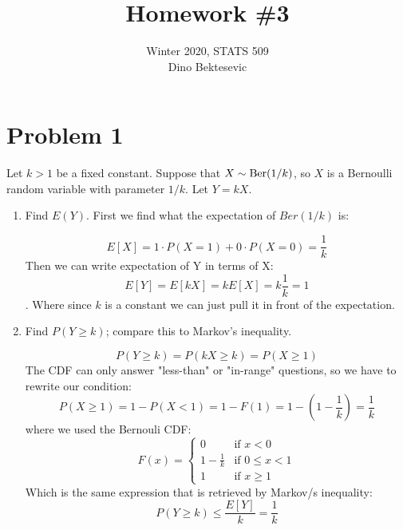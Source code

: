 \documentclass{article}
\date{{}}
\newcommand{\1}{\mathbf{1}}
\begin{document}
\title{Homework \#3}
\author{\normalsize{Winter 2020, STATS 509}\\
\normalsize{Dino Bektesevic}}
\maketitle

\section*{Problem 1}
Let $k > 1$ be a fixed constant. Suppose that $X \sim \hbox{Ber}(1/k)$, so $X$ is a Bernoulli random variable with parameter $1/k$. Let $Y=kX$.
\begin{enumerate}
    \item Find $E(Y)$. First we find what the expectation of $Ber(1/k)$ is:
    
    $$E[X] = 1\cdot P(X=1) + 0\cdot P(X=0) = \frac{1}{k}$$
    Then we can write expectation of Y in terms of X:
    $$E[Y] = E[kX] = k E[X] = k \frac{1}{k} = 1$$.
    Where since $k$ is a constant we can just pull it in front of the expectation. 
    
    \item Find $P(Y \geq k)$; compare this to Markov's inequality.
    
    $$P(Y\geq k) = P(kX \geq k) = P(X\geq 1)$$
    The CDF can only answer "less-than" or "in-range" questions, so we have to rewrite our condition:
    $$P(X\geq 1) = 1 - P(X<1) = 1 - F(1) = 1 - (1 - \frac{1}{k}) = \frac{1}{k}$$
    where we used the Bernouli CDF:
    $$F(x) = \begin{cases} 
	        0 &\mbox{if } x < 0 \\
	        1 - \frac{1}{k} &\mbox{if } 0 \leq x < 1 \\
            1 & \mbox{if } x \geq 1
        \end{cases}  
    $$
    Which is the same expression that is retrieved by Markov/s inequality:
    $$ P(Y\geq k) \leq \frac{E[Y]}{k} = \frac{1}{k}$$
\end{enumerate}


\newpage
\end{document}
